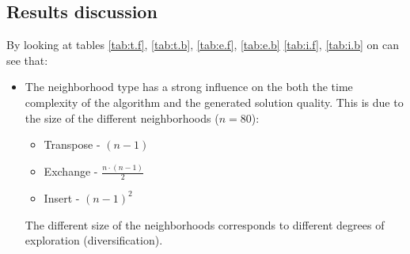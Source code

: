 \begin{homeworkProblem}

\subsection{Results discussion}
By looking at tables \ref{tab:t.f}, \ref{tab:t.b}, \ref{tab:e.f}, \ref{tab:e.b} \ref{tab:i.f}, \ref{tab:i.b} on can see that:
\begin{itemize}
\item The neighborhood type has a strong influence on the both the time complexity of the algorithm and the generated solution quality. This is due to the size of the different neighborhoods ($n=80$):
      \begin{itemize}
        \item Transpose - $(n-1)$
        \item Exchange - $\frac{n\cdot(n-1)}{2}$
        \item Insert - $(n-1)^2$
      \end{itemize}
The different size of the neighborhoods corresponds to different degrees of exploration (diversification).
      

\end{itemize}
\end{homeworkProblem}
